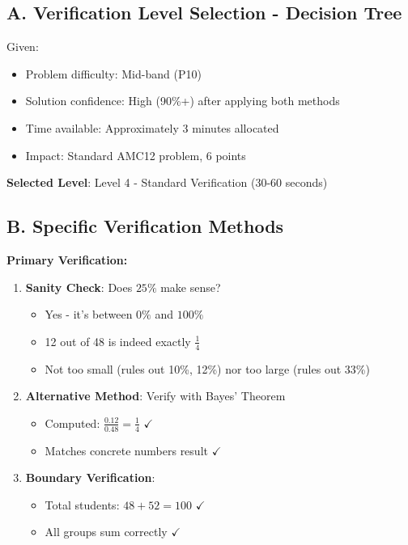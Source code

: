 \documentclass[]{article}
\begin{document}
\begin{verificationbox}
\subsection*{A. Verification Level Selection - Decision Tree}

Given:
\begin{itemize}[leftmargin=*]
    \item Problem difficulty: Mid-band (P10)
    \item Solution confidence: High (90\%+) after applying both methods
    \item Time available: Approximately 3 minutes allocated
    \item Impact: Standard AMC12 problem, 6 points
\end{itemize}

\textbf{Selected Level}: Level 4 - Standard Verification (30-60 seconds)

\subsection*{B. Specific Verification Methods}

\textbf{Primary Verification:}
\begin{enumerate}[leftmargin=*]
    \item \textbf{Sanity Check}: Does $25\%$ make sense?
    \begin{itemize}
        \item Yes - it's between $0\%$ and $100\%$
        \item 12 out of 48 is indeed exactly $\frac{1}{4}$
        \item Not too small (rules out 10\%, 12\%) nor too large (rules out 33\%)
    \end{itemize}
    
    \item \textbf{Alternative Method}: Verify with Bayes' Theorem
    \begin{itemize}
        \item Computed: $\frac{0.12}{0.48} = \frac{1}{4}$ $\checkmark$
        \item Matches concrete numbers result $\checkmark$
    \end{itemize}
    
    \item \textbf{Boundary Verification}:
    \begin{itemize}
        \item Total students: $48 + 52 = 100$ $\checkmark$
        \item All groups sum correctly $\checkmark$
    \end{itemize}
    

\end{enumerate}
\end{verificationbox}
\end{document}
